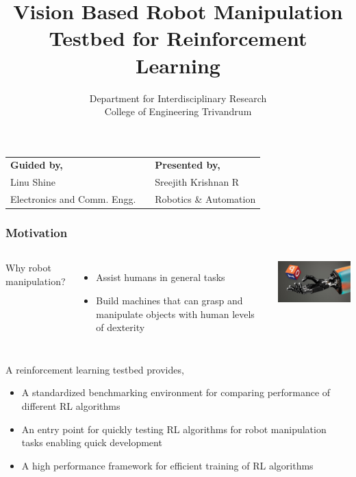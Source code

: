 \documentclass{beamer}
\title[Robotics \& Automation]{Vision Based Robot Manipulation Testbed for Reinforcement Learning}
\author[CET]{
	Department for Interdisciplinary Research\\ College of Engineering Trivandrum
}
\begin{document}
	
	\begin{frame}
		\maketitle
		
		\begin{tabularx}{\textwidth}{lXl}
			\textbf{Guided by,} & & \textbf{Presented by,} \\
			Linu Shine & & Sreejith Krishnan R \\
			Electronics and Comm. Engg. & & Robotics \& Automation
		\end{tabularx}
	\end{frame}

	\begin{frame}
		\frametitle{Motivation}
		
		\begin{columns}[c]
			\column{0.45 \textwidth}
			Why robot manipulation?
			\begin{itemize}
				\item Assist humans in general tasks
				\item Build machines that can grasp and manipulate objects with human levels of dexterity
			\end{itemize}
			
			\column{0.5 \textwidth}
			\includegraphics[width=6cm]{learning-dexterity}
		\end{columns}
		
		
		\vspace{2em}
		A reinforcement learning testbed provides,
		
		\begin{itemize}
			\item A standardized benchmarking environment for comparing performance of different RL algorithms
			\item An entry point for quickly testing RL algorithms for robot manipulation tasks enabling quick development
			\item A high performance framework for efficient training of RL algorithms
		\end{itemize}
	\end{frame}
	
\end{document}
